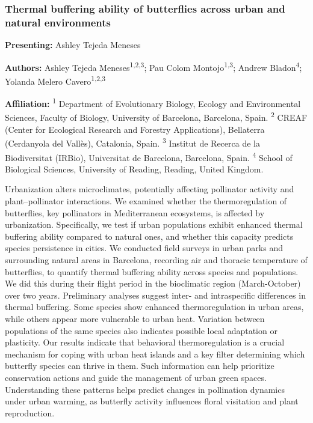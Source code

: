 \documentclass[
  letterpaper,
  DIV=11,
  numbers=noendperiod]{scrartcl}
\begin{document}
\subsubsection{Thermal buffering ability of butterflies across urban and
natural
environments}\label{thermal-buffering-ability-of-butterflies-across-urban-and-natural-environments}

\textbf{Presenting:} Ashley Tejeda Meneses

\textbf{Authors:} Ashley Tejeda Meneses\textsuperscript{1,2,3}; Pau
Colom Montojo\textsuperscript{1,3}; Andrew Bladon\textsuperscript{4};
Yolanda Melero Cavero\textsuperscript{1,2,3}

\textbf{Affiliation:} \textsuperscript{1} Department of Evolutionary
Biology, Ecology and Environmental Sciences, Faculty of Biology,
University of Barcelona, Barcelona, Spain. \textsuperscript{2} CREAF
(Center for Ecological Research and Forestry Applications), Bellaterra
(Cerdanyola del Vallès), Catalonia, Spain. \textsuperscript{3} Institut
de Recerca de la Biodiversitat (IRBio), Universitat de Barcelona,
Barcelona, Spain. \textsuperscript{4} School of Biological Sciences,
University of Reading, Reading, United Kingdom.

Urbanization alters microclimates, potentially affecting pollinator
activity and plant--pollinator interactions. We examined whether the
thermoregulation of butterflies, key pollinators in Mediterranean
ecosystems, is affected by urbanization. Specifically, we test if urban
populations exhibit enhanced thermal buffering ability compared to
natural ones, and whether this capacity predicts species persistence in
cities. We conducted field surveys in urban parks and surrounding
natural areas in Barcelona, recording air and thoracic temperature of
butterflies, to quantify thermal buffering ability across species and
populations. We did this during their flight period in the bioclimatic
region (March-October) over two years. Preliminary analyses suggest
inter- and intraspecific differences in thermal buffering. Some species
show enhanced thermoregulation in urban areas, while others appear more
vulnerable to urban heat. Variation between populations of the same
species also indicates possible local adaptation or plasticity. Our
results indicate that behavioral thermoregulation is a crucial mechanism
for coping with urban heat islands and a key filter determining which
butterfly species can thrive in them. Such information can help
prioritize conservation actions and guide the management of urban green
spaces. Understanding these patterns helps predict changes in
pollination dynamics under urban warming, as butterfly activity
influences floral visitation and plant reproduction.
\end{document}
